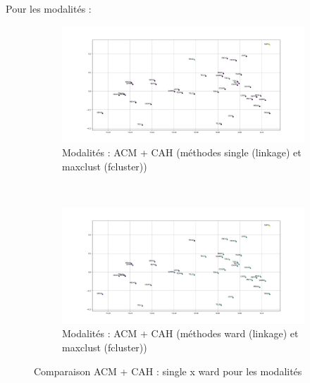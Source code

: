    Pour les modalités :
    
    \begin{figure}[!htb]
        \begin{subfigure}[b]{1.0\textwidth}
            \centering
            \includegraphics[width=1.0\textwidth]{img/mixte_acm_cah/ACM-Projection_des_modalites_cah_'single'_'maxclust'.jpg}
            \caption{Modalités : ACM + CAH (méthodes single (linkage) et maxclust (fcluster))}
            \label{Label_ACM-Projection_des_modalites_cah_'single'_'maxclust'.jpg}
        \end{subfigure}
        \\
        \begin{subfigure}[b]{0.6\textwidth}
            \centering
            \includegraphics[width=1.0\textwidth]{img/mixte_acm_cah/ACM-Projection_des_modalites_cah_'ward'_'maxclust'.jpg}
            \caption{Modalités : ACM + CAH (méthodes ward (linkage) et maxclust (fcluster))}
            \label{Label_ACM-Projection_des_modalites_cah_'ward'_'maxclust'.jpg}
        \end{subfigure}
        \caption{Comparaison ACM + CAH : single x ward pour les modalités}
    \end{figure}
    

